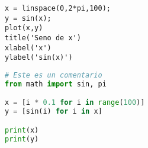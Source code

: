 \documentclass{article}
\begin{document}
\begin{lstlisting}[style=matlabstyle, caption={Mi código en MATLAB}]
% Este es un comentario
x = linspace(0,2*pi,100);
y = sin(x);
plot(x,y)
title('Seno de x')
xlabel('x')
ylabel('sin(x)')
\end{lstlisting}

\begin{lstlisting}[language=Python, style=pythonstyle, caption={Mi código en Python}]
# Este es un comentario
from math import sin, pi

x = [i * 0.1 for i in range(100)]
y = [sin(i) for i in x]

print(x)
print(y)
\end{lstlisting}
\end{document}
